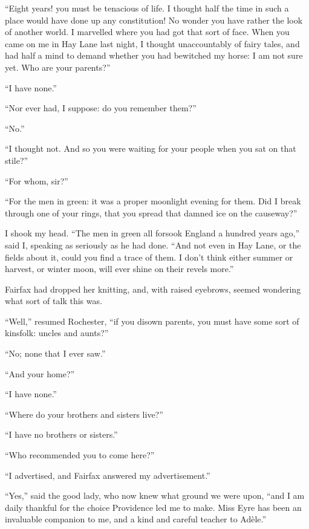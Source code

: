 \enquote{Eight years! you must be tenacious of life. I thought half the
	time in such a place would have done up any constitution! No wonder you
	have rather the look of another world. I marvelled where you had got
	that sort of face. When you came on me in Hay Lane last night, I
	thought unaccountably of fairy tales, and had half a mind to demand
	whether you had bewitched my horse: I am not sure yet. Who are your
	parents?}

\enquote{I have none.}

\enquote{Nor ever had, I suppose: do you remember them?}

\enquote{No.}

\enquote{I thought not. And so you were waiting for your people when
	you sat on that stile?}

\enquote{For whom, sir?}

\enquote{For the men in green: it was a proper moonlight evening for
	them. Did I break through one of your rings, that you spread that
	damned ice on the causeway?}

I shook my head. \enquote{The men in green all forsook England a
	hundred years ago,} said I, speaking as seriously as he had done.
\enquote{And not even in Hay Lane, or the fields about it, could you
	find a trace of them. I don't think either summer or harvest, or winter
	moon, will ever shine on their revels more.}

\Mrs{} Fairfax had dropped her knitting, and, with raised eyebrows, seemed
wondering what sort of talk this was.

\enquote{Well,} resumed \Mr{} Rochester, \enquote{if you disown parents,
	you must have some sort of kinsfolk: uncles and aunts?}

\enquote{No; none that I ever saw.}

\enquote{And your home?}

\enquote{I have none.}

\enquote{Where do your brothers and sisters live?}

\enquote{I have no brothers or sisters.}

\enquote{Who recommended you to come here?}

\enquote{I advertised, and \Mrs{} Fairfax answered my advertisement.}

\enquote{Yes,} said the good lady, who now knew what ground we were
upon, \enquote{and I am daily thankful for the choice Providence led me
	to make. Miss Eyre has been an invaluable companion to me, and a kind
	and careful teacher to Adèle.}

